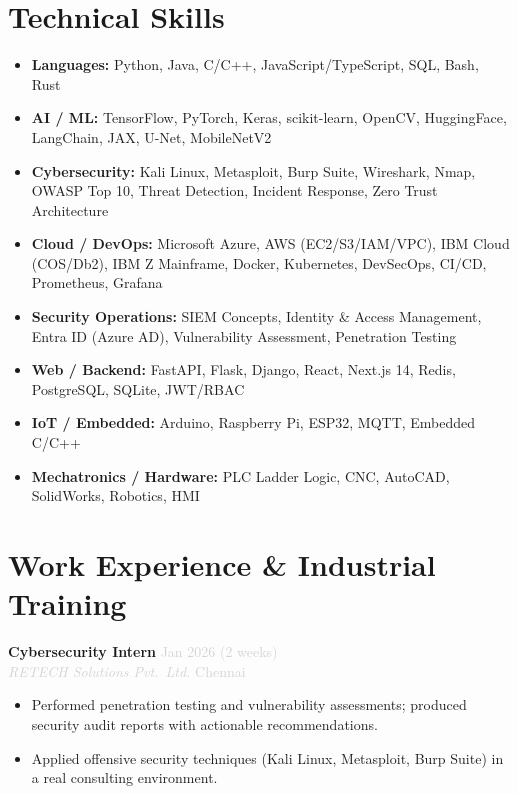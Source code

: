 \documentclass[9.5pt, letterpaper]{article}
\newcommand{\role}[4]{%
  \textbf{#1} \hfill \textcolor{lightgray}{\small #2}\\[-1pt]
  \textit{\textcolor{lightgray}{\small #3}} \hfill \textcolor{lightgray}{\small #4}}
\begin{document}
\section{Technical Skills}
\vspace{1pt}
\begin{itemize}
  \item \textbf{Languages:} Python, Java, C/C++, JavaScript/TypeScript, SQL, Bash, Rust
  \item \textbf{AI / ML:} TensorFlow, PyTorch, Keras, scikit-learn, OpenCV, HuggingFace, LangChain, JAX, U-Net, MobileNetV2
  \item \textbf{Cybersecurity:} Kali Linux, Metasploit, Burp Suite, Wireshark, Nmap, OWASP Top 10, Threat Detection, Incident Response, Zero Trust Architecture
  \item \textbf{Cloud / DevOps:} Microsoft Azure, AWS (EC2/S3/IAM/VPC), IBM Cloud (COS/Db2), IBM Z Mainframe, Docker, Kubernetes, DevSecOps, CI/CD, Prometheus, Grafana
  \item \textbf{Security Operations:} SIEM Concepts, Identity \& Access Management, Entra ID (Azure AD), Vulnerability Assessment, Penetration Testing
  \item \textbf{Web / Backend:} FastAPI, Flask, Django, React, Next.js 14, Redis, PostgreSQL, SQLite, JWT/RBAC
  \item \textbf{IoT / Embedded:} Arduino, Raspberry Pi, ESP32, MQTT, Embedded C/C++
  \item \textbf{Mechatronics / Hardware:} PLC Ladder Logic, CNC, AutoCAD, SolidWorks, Robotics, HMI
\end{itemize}

\section{Work Experience \& Industrial Training}
\vspace{1pt}

\role{Cybersecurity Intern}{Jan 2026 (2 weeks)}{RETECH Solutions Pvt.\ Ltd.}{Chennai}
\begin{itemize}
  \item Performed penetration testing and vulnerability assessments; produced security audit reports with actionable recommendations.
  \item Applied offensive security techniques (Kali Linux, Metasploit, Burp Suite) in a real consulting environment.
\end{itemize}
\vspace{4pt}
\end{document}
